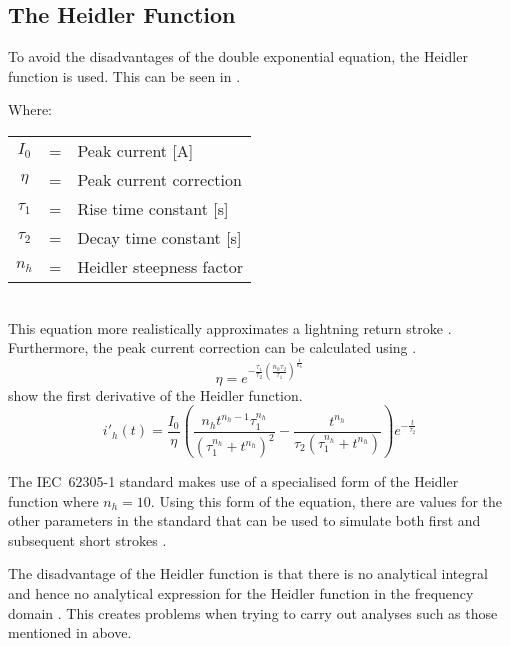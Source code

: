 \subsection{The Heidler Function}
\label{sub:background_heidler}
To avoid the disadvantages of the double exponential equation, the Heidler function is used. This can be seen in .

Where: \\
\begin{tabular}{cll}
    $I_0$ & = & Peak current [A] \\
    $\eta$ & = & Peak current correction \\
    $\tau_1$ & = & Rise time constant [s] \\
    $\tau_2$ & = & Decay time constant [s] \\
    $n_h$ & = & Heidler steepness factor
\end{tabular}\\
This equation more realistically approximates a lightning return stroke \cite{ZhangFeizhouandLiuShanghe2002,Lovric2013,Delfino2012}. Furthermore, the peak current correction can be calculated using  \cite{Delfino2012,Javor2011,Heidler1999}.
\begin{equation}
    \eta =e^{-\frac{\tau _1}{\tau _2} \left(\frac{n_h \tau _2}{\tau _1}\right)^{\frac{1}{n_h}}}
    \label{eqn:eta}
\end{equation}
 show the first derivative of the Heidler function.
\begin{equation}
    i'_h \left( t \right) = \frac{I_0}{\eta} \left( \frac{n_h t^{n_h - 1} \tau_1^{n_h}}{\left(\tau_1^{n_h} + t^{n_h} \right)^2} - \frac{t^{n_h}}{\tau_2 \left(\tau_1^{n_h} + t^{n_h} \right)} \right) e^{-\frac{t}{\tau_2}}
    \label{eqn:dHF}
\end{equation}

The IEC~62305-1 standard makes use of a specialised form of the Heidler function where $n_h = 10$. Using this form of the equation, there are values for the other parameters in the standard that can be used to simulate both first and subsequent short strokes \cite{IEC623051,Heidler2008}.

The disadvantage of the Heidler function is that there is no analytical integral and hence no analytical expression for the Heidler function in the frequency domain \cite{ZhangFeizhouandLiuShanghe2002,Lovric2013}. This creates problems when trying to carry out analyses such as those mentioned in  above.

